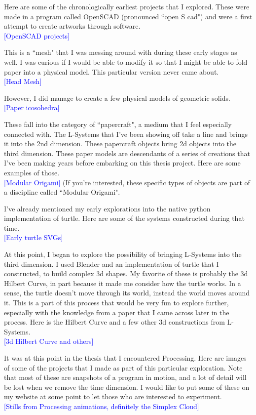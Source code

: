 \documentclass[12pt,twoside]{reedthesis}
\begin{document}
	Here are some of the chronologically earliest projects that I explored. These were made in a program called OpenSCAD (pronounced ``open S cad") and were a first attempt to create artworks through software.\\
	\textcolor{blue}{[OpenSCAD projects]}
	
	This is a ``mesh" that I was messing around with during these early stages as well. I was curious if I would be able to modify it so that I might be able to fold paper into a physical model. This particular version never came about.\\
	\textcolor{blue}{[Head Mesh]}
	
	However, I did manage to create a few physical models of geometric solids.\\
	\textcolor{blue}{[Paper icosohedra]}
	
	These fall into the category of ``papercraft", a medium that I feel especially connected with. The L-Systems that I've been showing off take a line and brings it into the 2nd dimension. These papercraft objects bring 2d objects into the third dimension. These paper models are descendants of a series of creations that I've been making years before embarking on this thesis project. Here are some examples of those.\\
	\textcolor{blue}{[Modular Origami]} (If you're interested, these specific types of objects are part of a discipline called ``Modular Origami".
	
	I've already mentioned my early explorations into the native python implementation of turtle. Here are some of the systems constructed during that time.\\
	\textcolor{blue}{[Early turtle SVGs]}
	
	At this point, I began to explore the possibility of bringing L-Systems into the third dimension. I used Blender and an implementation of turtle that I constructed, to build complex 3d shapes. My favorite of these is probably the 3d Hilbert Curve, in part because it made me consider how the turtle works. In a sense, the turtle doesn't move through its world, instead the world moves around it. This is a part of this process that would be very fun to explore further, especially with the knowledge from a paper that I came across later in the process. Here is the Hilbert Curve and a few other 3d constructions from L-Systems.\\
	\textcolor{blue}{[3d Hilbert Curve and others]}
	
	It was at this point in the thesis that I encountered Processing. Here are images of some of the projects that I made as part of this particular exploration. Note that most of these are snapshots of a program in motion, and a lot of detail will be lost when we remove the time dimension. I would like to put some of these on my website at some point to let those who are interested to experiment.\\
	\textcolor{blue}{[Stills from Processing animations, definitely the Simplex Cloud]}
	
\end{document}
